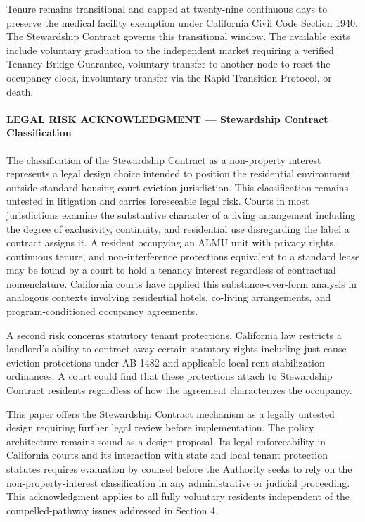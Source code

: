 \documentclass[12pt, letterpaper]{article}
\begin{document}
Tenure remains transitional and capped at twenty-nine continuous days to preserve the medical facility exemption under California Civil Code Section 1940. The Stewardship Contract governs this transitional window. The available exits include voluntary graduation to the independent market requiring a verified Tenancy Bridge Guarantee, voluntary transfer to another node to reset the occupancy clock, involuntary transfer via the Rapid Transition Protocol, or death.

\paragraph{LEGAL RISK ACKNOWLEDGMENT — Stewardship Contract Classification}
The classification of the Stewardship Contract as a non-property interest represents a legal design choice intended to position the residential environment outside standard housing court eviction jurisdiction. This classification remains untested in litigation and carries foreseeable legal risk. Courts in most jurisdictions examine the substantive character of a living arrangement including the degree of exclusivity, continuity, and residential use disregarding the label a contract assigns it. A resident occupying an ALMU unit with privacy rights, continuous tenure, and non-interference protections equivalent to a standard lease may be found by a court to hold a tenancy interest regardless of contractual nomenclature. California courts have applied this substance-over-form analysis in analogous contexts involving residential hotels, co-living arrangements, and program-conditioned occupancy agreements.

A second risk concerns statutory tenant protections. California law restricts a landlord's ability to contract away certain statutory rights including just-cause eviction protections under AB 1482 and applicable local rent stabilization ordinances. A court could find that these protections attach to Stewardship Contract residents regardless of how the agreement characterizes the occupancy.

This paper offers the Stewardship Contract mechanism as a legally untested design requiring further legal review before implementation. The policy architecture remains sound as a design proposal. Its legal enforceability in California courts and its interaction with state and local tenant protection statutes requires evaluation by counsel before the Authority seeks to rely on the non-property-interest classification in any administrative or judicial proceeding. This acknowledgment applies to all fully voluntary residents independent of the compelled-pathway issues addressed in Section 4.
\end{document}

